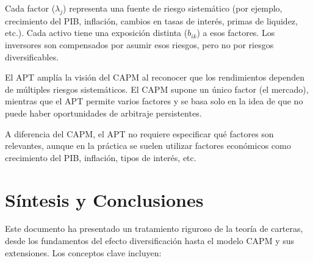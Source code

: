 Cada factor ($\lambda_j$) representa una fuente de riesgo sistemático (por ejemplo, crecimiento del PIB, inflación, cambios en tasas de interés, primas de liquidez, etc.). Cada activo tiene una exposición distinta ($b_{ik}$) a esos factores. Los inversores son compensados por asumir esos riesgos, pero no por riesgos diversificables.

El APT amplía la visión del CAPM al reconocer que los rendimientos dependen de múltiples riesgos sistemáticos. El CAPM supone un único factor (el mercado), mientras que el APT permite varios factores y se basa solo en la idea de que no puede haber oportunidades de arbitraje persistentes.

A diferencia del CAPM, el APT no requiere especificar qué factores son relevantes, aunque en la práctica se suelen utilizar factores económicos como crecimiento del PIB, inflación, tipos de interés, etc.

\section{Síntesis y Conclusiones}

Este documento ha presentado un tratamiento riguroso de la teoría de carteras, desde los fundamentos del efecto diversificación hasta el modelo CAPM y sus extensiones. Los conceptos clave incluyen:

